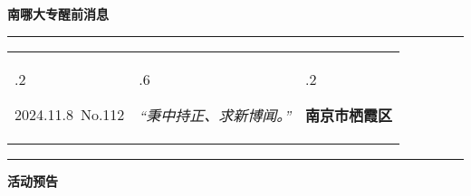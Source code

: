 \documentclass[letterpaper, 12pt]{article}
\begin{document}
\begin{center}
    \Huge\textbf{南哪大专醒前消息}
\end{center}
\vspace{4mm}
\hrule
\renewcommand\tabularxcolumn[1]{m{#1}}
\begin{tabularx}{\textwidth}{>{\hsize.2\hsize}X>{\hsize.6\hsize}X>{\hsize.2\hsize}X}
    \begin{flushleft}
        2024.11.8\, No.112
    \end{flushleft}
    &
    \begin{center}
        \textit{“秉中持正、求新博闻。”}
    \end{center}
    &
    \begin{flushright}
        \textbf{南京市栖霞区}
    \end{flushright}
\end{tabularx}
\vspace{-3.5mm}
\hrule
\vspace{4mm}
\centerline{\huge\textbf{活动预告}}
\end{document}
